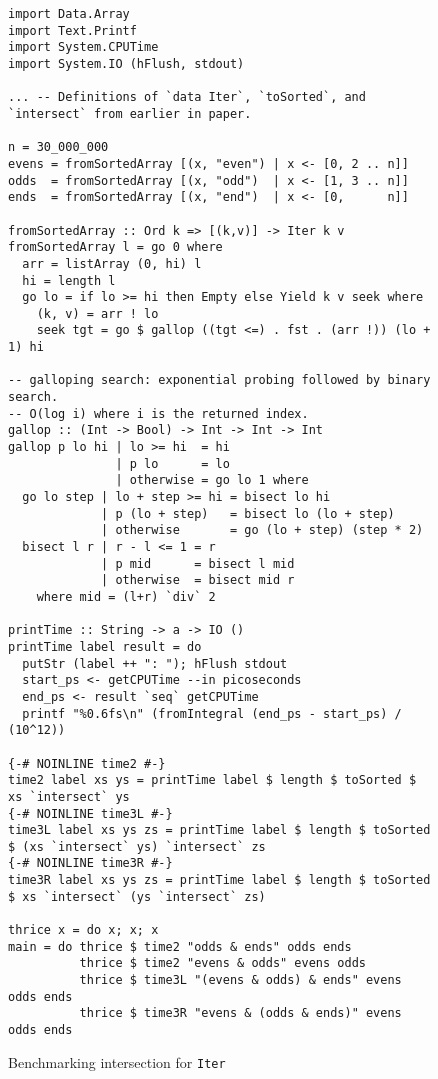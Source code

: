 \documentclass[acmsmall,screen,dvipsnames,svgnames]{acmart}
\newcommand\hask[1]{\texttt{#1}}
\begin{document}

\begin{figure}
  \begin{verbatim}
import Data.Array
import Text.Printf
import System.CPUTime
import System.IO (hFlush, stdout)

... -- Definitions of `data Iter`, `toSorted`, and `intersect` from earlier in paper.

n = 30_000_000
evens = fromSortedArray [(x, "even") | x <- [0, 2 .. n]]
odds  = fromSortedArray [(x, "odd")  | x <- [1, 3 .. n]]
ends  = fromSortedArray [(x, "end")  | x <- [0,      n]]

fromSortedArray :: Ord k => [(k,v)] -> Iter k v
fromSortedArray l = go 0 where
  arr = listArray (0, hi) l
  hi = length l
  go lo = if lo >= hi then Empty else Yield k v seek where
    (k, v) = arr ! lo
    seek tgt = go $ gallop ((tgt <=) . fst . (arr !)) (lo + 1) hi

-- galloping search: exponential probing followed by binary search.
-- O(log i) where i is the returned index.
gallop :: (Int -> Bool) -> Int -> Int -> Int
gallop p lo hi | lo >= hi  = hi
               | p lo      = lo
               | otherwise = go lo 1 where
  go lo step | lo + step >= hi = bisect lo hi
             | p (lo + step)   = bisect lo (lo + step)
             | otherwise       = go (lo + step) (step * 2)
  bisect l r | r - l <= 1 = r
             | p mid      = bisect l mid
             | otherwise  = bisect mid r
    where mid = (l+r) `div` 2

printTime :: String -> a -> IO ()
printTime label result = do
  putStr (label ++ ": "); hFlush stdout
  start_ps <- getCPUTime --in picoseconds
  end_ps <- result `seq` getCPUTime
  printf "%0.6fs\n" (fromIntegral (end_ps - start_ps) / (10^12))

{-# NOINLINE time2 #-}
time2 label xs ys = printTime label $ length $ toSorted $ xs `intersect` ys
{-# NOINLINE time3L #-}
time3L label xs ys zs = printTime label $ length $ toSorted $ (xs `intersect` ys) `intersect` zs
{-# NOINLINE time3R #-}
time3R label xs ys zs = printTime label $ length $ toSorted $ xs `intersect` (ys `intersect` zs)

thrice x = do x; x; x
main = do thrice $ time2 "odds & ends" odds ends
          thrice $ time2 "evens & odds" evens odds
          thrice $ time3L "(evens & odds) & ends" evens odds ends
          thrice $ time3R "evens & (odds & ends)" evens odds ends
  \end{verbatim}
  \caption{Benchmarking intersection for \hask{Iter}}
  \label{fig:iter-benchmark}
\end{figure}
\end{document}
